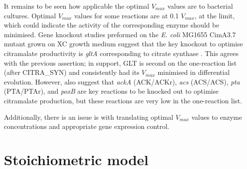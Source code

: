 \documentclass[parskip=full, numbers=noenddot]{scrreprt}
\begin{document}
It remains to be seen how applicable the optimal $V_{max}$ values are to bacterial cultures. Optimal $V_{max}$ values for some reactions are at 0.1 $V_{max}$, at the limit, which could indicate the activity of the corresponding enzyme should be minimised. Gene knockout studies preformed on the \emph{E. coli} MG1655 CimA3.7 mutant grown on XC growth medium suggest that the key knockout to optimise citramalate productivity is \emph{gltA} corresponding to citrate synthase \citep{wu_production_2016}. This agrees with the previous assertion; in support, GLT is second on the one-reaction list (after CITRA\_SYN) and consistently had its $V_{max}$ minimised in differential evolution. However, \citet{wu_production_2016} also suggest that \emph{ackA} (ACK/ACKr), \emph{acs} (ACS/ACS), \emph{pta} (PTA/PTAr), and \emph{poxB} are key reactions to be knocked out to optimise citramalate production, but these reactions are very low in the one-reaction list.

Additionally, there is an issue is with translating optimal $V_{max}$ values to enzyme concentrations and appropriate gene expression control. 



\section{Stoichiometric model}
\label{sec:discussion-stoichiometric}




\end{document}
